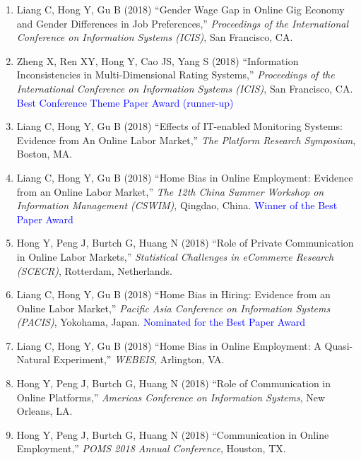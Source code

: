 \documentclass[paper=letter,fontsize=10pt]{scrartcl} %
\newcommand{\ConfEntry}[6]{
		\noindent #1 (#2) ``#3,'' \textit{#4}, #5. \textcolor{blue}{#6}}
\newcommand{\Hong}{Hong Y}
\begin{document}
\begin{enumerate}
\item \ConfEntry{Liang C, \Hong, Gu B}{2018}{Gender Wage Gap in Online Gig Economy and Gender Differences in Job Preferences}{Proceedings of the International Conference on Information Systems (ICIS)}{San Francisco, CA}{}

\item \ConfEntry{Zheng X, Ren XY, \Hong, Cao JS, Yang S}{2018}{Information Inconsistencies in Multi-Dimensional Rating Systems}{Proceedings of the International Conference on Information Systems (ICIS)}{San Francisco, CA}{\protect\newline Best Conference Theme Paper Award (runner-up)}

\item \ConfEntry{Liang C, \Hong, Gu B}{2018}{Effects of IT-enabled Monitoring Systems: Evidence from An Online Labor Market}{The Platform Research Symposium}{Boston, MA}{}

\item \ConfEntry{Liang C, \Hong, Gu B}{2018}{Home Bias in Online Employment: Evidence from an Online Labor Market}{The 12th China Summer Workshop on Information Management (CSWIM)}{Qingdao, China}{\protect\newline Winner of the Best Paper Award}

\item \ConfEntry{\Hong, Peng J, Burtch G, Huang N}{2018}{Role of Private Communication in Online Labor Markets}{Statistical Challenges in eCommerce Research (SCECR)}{Rotterdam, Netherlands}{}

\item \ConfEntry{Liang C, \Hong, Gu B}{2018}{Home Bias in Hiring: Evidence from an Online Labor Market}{Pacific Asia Conference on Information Systems (PACIS)}{Yokohama, Japan}{\protect\newline Nominated for the Best Paper Award}

\item \ConfEntry{Liang C, \Hong, Gu B}{2018}{Home Bias in Online Employment: A Quasi-Natural Experiment}{WEBEIS}{Arlington, VA}{}

\item \ConfEntry{\Hong, Peng J, Burtch G, Huang N}{2018}{Role of Communication in Online Platforms}{Americas Conference on Information Systems}{New Orleans, LA}{}

\item \ConfEntry{\Hong, Peng J, Burtch G, Huang N}{2018}{Communication in Online Employment}{POMS 2018 Annual Conference}{Houston, TX}{}


\end{enumerate}
\end{document}
